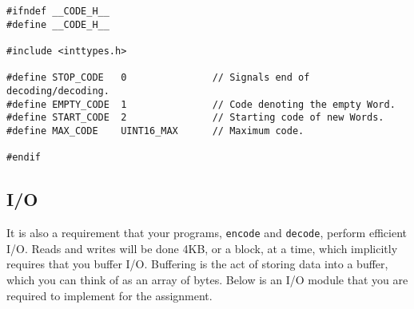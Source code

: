 \documentclass{article}
\begin{document}
\begin{lstlisting}[title=code.h]
#ifndef __CODE_H__
#define __CODE_H__

#include <inttypes.h>

#define STOP_CODE   0               // Signals end of decoding/decoding.
#define EMPTY_CODE  1               // Code denoting the empty Word.
#define START_CODE  2               // Starting code of new Words.
#define MAX_CODE    UINT16_MAX      // Maximum code.

#endif
\end{lstlisting}

\subsection{I/O}

It is also a requirement that your programs, \texttt{encode} and
\texttt{decode}, perform efficient I/O. Reads and writes will be done 4KB, or a
block, at a time, which implicitly requires that you buffer I/O. Buffering is
the act of storing data into a buffer, which you can think of as an array of
bytes. Below is an I/O module that you are required to implement for the
assignment.
\end{document}
